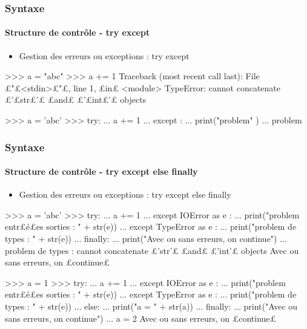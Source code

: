 \begin{frame}[fragile]
\frametitle{Syntaxe}
\framesubtitle{Structure de contrôle - try except}
\begin{itemize}
\item Gestion des erreurs ou exceptions : try except 
\end{itemize}
\begin{pythonConsole}
>>> a = "abc"
>>> a += 1
Traceback (most recent call last):
  File £"£<stdin>£"£, line 1, £in£ <module>
TypeError: cannot concatenate £'£str£'£ £and£ £'£int£'£ objects
\end{pythonConsole}
\begin{pythonConsole}
>>> a = 'abc'
>>> try: 
...     a += 1
... except : 
...     print("problem" )
... 
problem
\end{pythonConsole}
\end{frame}
\begin{frame}[fragile]
\frametitle{Syntaxe}
\framesubtitle{Structure de contrôle - try except else finally}
\begin{itemize}
\item Gestion des erreurs ou exceptions : try except else finally 
\end{itemize}
\begin{pythonConsole}
>>> a = 'abc'
>>> try: 
...     a += 1
... except IOError as e :
...     print("problem entr£{\color{magenta}é}£es sorties : " + str(e))
... except TypeError as e :
...     print("problem de types : " + str(e))
... finally:
...     print("Avec ou sans erreurs, on continue")
... 
problem de types : cannot concatenate £'str'£ £and£ £'int'£ objects
Avec ou sans erreurs, on £continue£
\end{pythonConsole}
\begin{pythonConsole}
>>> a = 1
>>> try: 
...     a += 1
... except IOError as e :
...     print("problem entr£{\color{magenta}é}£es sorties : " + str(e))
... except TypeError as e :
...     print("problem de types : " + str(e))
... else: 
...     print("a = " + str(a))
... finally:
...     print("Avec ou sans erreurs, on continue")
...
a = 2
Avec ou sans erreurs, on £continue£
\end{pythonConsole}
\end{frame}
